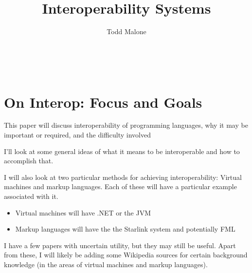 \documentclass{sig-alternate}
\begin{document}

\title{Interoperability Systems}


\author{
\alignauthor
Todd Malone\\
	\\
	\\
	\\
}

\maketitle


\section{On Interop: Focus and Goals}
This paper will discuss interoperability of programming languages, why it may be important or required, and the difficulty involved\cite{Shetty:2009,Chisnall:2013}

I'll look at some general ideas of what it means to be interoperable and how to accomplish that.\cite{Ide:2010, Osera:2012}

I will also look at two particular methods for achieving interoperability: Virtual machines and markup languages. Each of these will have a particular example associated with it.
\begin{itemize}
\item Virtual machines will have .NET or the JVM \cite{Li:2013,Hamilton:2003}
\item Markup languages will have the the Starlink system \cite{Bromberk:2011} and potentially FML \cite{Acampora:2013}
\end{itemize}

I have a few papers with uncertain utility\cite{Kats:2010,Matthews:2009, Chen:2010}, but they may still be useful.
Apart from these, I will likely be adding some Wikipedia sources for certain background knowledge (in the areas of virtual machines and markup languages).


  

\end{document}
